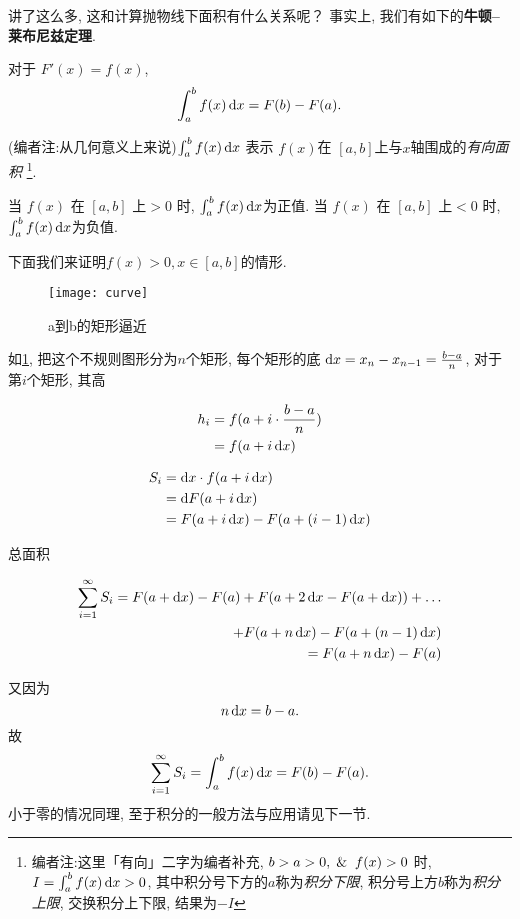 讲了这么多, 这和计算抛物线下面积有什么关系呢？
事实上, 我们有如下的\textbf{牛顿--莱布尼兹定理}.

\begin{theorem}[牛顿--莱布尼兹定理]
  对于 $F'(x) = f(x)$,
  \[
    \int _{a} ^{b} f(x) \mathop{}\!\mathrm{d} x = F(b) - F(a)
  .\]
\end{theorem}

(编者注:从几何意义上来说)$\int _a^b f(x) \mathop{}\!\mathrm{d} x$ 表示 $f(x)$在 $[a,b]$上与$x$轴围成的\emph{有向面积}
\footnote{编者注:这里「有向」二字为编者补充, $b>a>0,\And f(x)>0$ 时, $I = \int _a ^b
  f(x) \mathop{}\!\mathrm{d} x >0$,
其中积分号下方的$a$称为\emph{积分下限}, 积分号上方$b$称为\emph{积分上限}, 交换积分上下限, 结果为$-I$}.

当 $f(x)$ 在 $[a,b]$ 上$>0$ 时, $\int _a ^{b} f(x) \mathop{}\!\mathrm{d} x $为正值.
当 $f(x)$ 在 $[a,b]$ 上$<0$ 时, $\int _a ^{b} f(x) \mathop{}\!\mathrm{d} x $为负值.

下面我们来证明$f(x)> 0,x \in [a,b]$的情形.

\begin{figure}[!htbp]
  \begin{center}
    \texttt{[image: curve]}
  \end{center}
  \caption{a到b的矩形逼近}\label{fig:absim}
\end{figure}

如\cref{fig:absim}, 把这个不规则图形分为$n$个矩形,
每个矩形的底 $\mathop{}\!\mathrm{d} x = x_n - x_{n-1} =\frac{b-a}{n}$,
对于第$i$个矩形, 其高

\begin{align*}
  h_i & = f(a+ i \cdot \frac{b-a}{n}) \\
  & = f(a+ i \mathop{}\!\mathrm{d} x)
\end{align*}

\begin{align*}
  S_i & = \mathop{}\!\mathrm{d} x \cdot f(a+i \mathop{}\!\mathrm{d} x)         \\
  & = \mathop{}\!\mathrm{d} F(a+i\mathop{}\!\mathrm{d} x)                  \\
  & = F(a+ i \mathop{}\!\mathrm{d} x) - F(a+(i-1) \mathop{}\!\mathrm{d} x)
\end{align*}

总面积

\begin{align*}
  \sum_{i=1}^{\infty} S_i  = F(a+\mathop{}\!\mathrm{d} x ) - F(a) + F(a+2 \mathop{}\!\mathrm{d} x -
  F(a+\mathop{}\!\mathrm{d} x )) +\ldots \\
  + F(a+n\mathop{}\!\mathrm{d} x) - F(a+ (n-1)\mathop{}\!\mathrm{d} x)
  \notag                \\
  = F(a+n \mathop{}\!\mathrm{d} x) - F(a)
\end{align*}

又因为
\[
  n\mathop{}\!\mathrm{d} x = b-a
.\]
故
\[
  \sum_{i=1}^{\infty} S_i = \int _a^{b} f(x) \mathop{}\!\mathrm{d} x = F(b) - F(a)
.\]
小于零的情况同理, 至于积分的一般方法与应用请见下一节.

